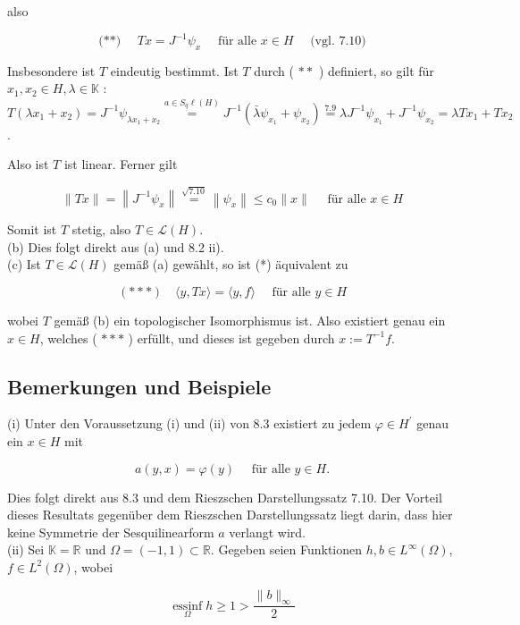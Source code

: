 \documentclass[10pt, letterpaper]{article}
\begin{document}
also

$$
\text { (**) } \quad T x=J^{-1} \psi_{x} \quad \text { für alle } x \in H \quad \text { (vgl. 7.10) }
$$

Insbesondere ist $T$ eindeutig bestimmt. Ist $T$ durch ( $* *$ ) definiert, so gilt für $x_{1}, x_{2} \in H, \lambda \in \mathbb{K}$ :\\
$T\left(\lambda x_{1}+x_{2}\right)=J^{-1} \psi_{\lambda x_{1}+x_{2}} \stackrel{a \in S_{\underline{q}} \ell(H)}{=} J^{-1}\left(\bar{\lambda} \psi_{x_{1}}+\psi_{x_{2}}\right) \stackrel{7.9}{=} \lambda J^{-1} \psi_{x_{1}}+J^{-1} \psi_{x_{2}}=\lambda T x_{1}+T x_{2}$.

Also ist $T$ ist linear. Ferner gilt

$$
\|T x\|=\left\|J^{-1} \psi_{x}\right\| \stackrel{\sqrt{7.10}}{=}\left\|\psi_{x}\right\| \leq c_{0}\|x\| \quad \text { für alle } x \in H
$$

Somit ist $T$ stetig, also $T \in \mathcal{L}(H)$.\\
(b) Dies folgt direkt aus (a) und 8.2 ii).\\
(c) Ist $T \in \mathcal{L}(H)$ gemäß (a) gewählt, so ist (*) äquivalent zu

$$
(* * *) \quad\langle y, T x\rangle=\langle y, f\rangle \quad \text { für alle } y \in H
$$

wobei $T$ gemäß (b) ein topologischer Isomorphismus ist. Also existiert genau ein $x \in H$, welches ( $* * *$ ) erfüllt, und dieses ist gegeben durch $x:=T^{-1} f$.

\subsection*{Bemerkungen und Beispiele}
(i) Unter den Voraussetzung (i) und (ii) von 8.3 existiert zu jedem $\varphi \in H^{\prime}$ genau ein $x \in H$ mit

$$
a(y, x)=\varphi(y) \quad \text { für alle } y \in H .
$$

Dies folgt direkt aus 8.3 und dem Rieszschen Darstellungssatz 7.10. Der Vorteil dieses Resultats gegenüber dem Rieszschen Darstellungssatz liegt darin, dass hier keine Symmetrie der Sesquilinearform $a$ verlangt wird.\\
(ii) Sei $\mathbb{K}=\mathbb{R}$ und $\Omega=(-1,1) \subset \mathbb{R}$. Gegeben seien Funktionen $h, b \in L^{\infty}(\Omega)$, $f \in L^{2}(\Omega)$, wobei

$$
\underset{\Omega}{\operatorname{essinf}} h \geq 1>\frac{\|b\|_{\infty}}{2}
$$
\end{document}
